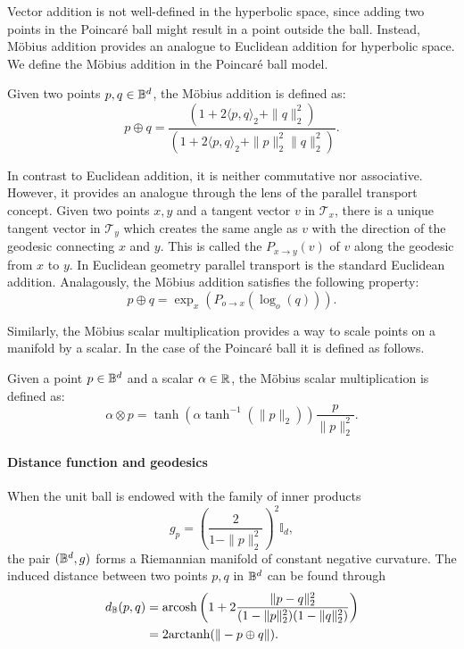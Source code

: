 Vector addition is not well-defined in the hyperbolic space, since adding two points in the Poincaré ball might result in a point outside the ball. Instead, Möbius addition provides an analogue to Euclidean addition for hyperbolic space. We define the Möbius addition in the Poincaré ball model.

\begin{definition}
    Given two points $p,q\in\mathbb{B}^d$, the Möbius addition is defined as:
    \begin{equation*}
        p \oplus q = \frac{(1 +  2\langle p,q\rangle_2 + \|q\|^2_2)}{(1 + 2\langle p,q\rangle_2 + \|p\|^2_2\|q\|^2_2)}.
    \end{equation*}
    
\end{definition}

In contrast to Euclidean addition, it is neither commutative nor associative. However, it provides an analogue through the lens of the parallel transport concept. Given two points $x,y$ and a tangent vector $v$ in $\mathcal{T}_x$, there is a unique tangent vector in $\mathcal{T}_y$ which creates the same angle as $v$ with the direction of the geodesic connecting $x$ and $y$. This is called the  $P_{x\to y} (v)$ of $v$ along the geodesic from $x$ to $y$. In Euclidean geometry parallel transport is the standard Euclidean addition. Analagously, the Möbius addition satisfies the following property:
\begin{equation*}
    p\oplus q=\exp_{x}(P_{o\to x}(\log_o(q))).
\end{equation*}

Similarly, the Möbius scalar multiplication provides a way to scale points on a manifold by a scalar. In the case of the Poincaré ball it is defined as follows.

\begin{definition}
    Given a point $p\in\mathbb{B}^d$ and a scalar $\alpha\in\mathbb{R}$, the Möbius scalar multiplication is defined as:
    \begin{equation*}
        \alpha \otimes p = \tanh({\alpha \tanh^{-1}(\|p\|_2)})\frac{p}{\|p\|^2_2}.
    \end{equation*}
\end{definition}

\paragraph{Distance function and geodesics}
When the unit ball is endowed with the family of inner products
\begin{equation*}
    g_p = \left(\frac{2}{1-\|p\|^2_2}\right)^2\mathbb{I}_d,
\end{equation*}
the pair $(\mathbb{B}^d,g)$ forms a Riemannian manifold of constant negative curvature. The induced distance between two points $p,q$ in $\mathbb{B}^d$ can be found through
\begin{align}\label{eq:poincareDistance}
    d_{\mathbb{B}}(p,q) &= \text{arcosh}\left(1 + 2\frac{\|p-q\|^2_2}{(1-\|p\|^2_2)(1-\|q\|^2_2)}\right)\\
              &= 2\text{arctanh}(\|-p\oplus q\|).
\end{align}

